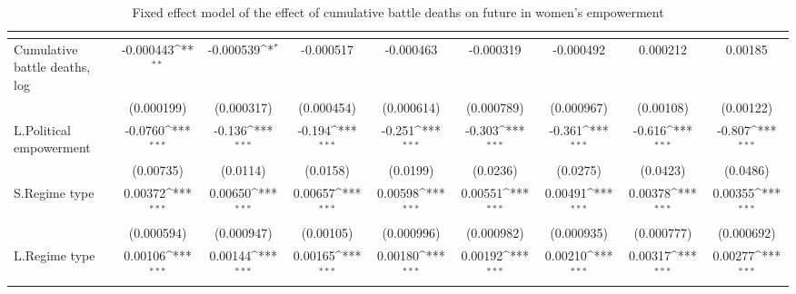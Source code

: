 \begin{table}[htbp]\centering
\def\sym#1{\ifmmode^{#1}\else\(^{#1}\)\fi}
\caption{Fixed effect model of the effect of cumulative battle deaths on future in women's empowerment\label{culmudeaths}}
\begin{tabular}{l*{8}{c}}
\hline\hline
                    &&&&&&&&\\
\hline
Cumulative battle deaths, log&   -0.000443\sym{**} &   -0.000539\sym{*}  &   -0.000517         &   -0.000463         &   -0.000319         &   -0.000492         &    0.000212         &     0.00185         \\
                    &  (0.000199)         &  (0.000317)         &  (0.000454)         &  (0.000614)         &  (0.000789)         &  (0.000967)         &   (0.00108)         &   (0.00122)         \\
[1em]
L.Political empowerment&     -0.0760\sym{***}&      -0.136\sym{***}&      -0.194\sym{***}&      -0.251\sym{***}&      -0.303\sym{***}&      -0.361\sym{***}&      -0.616\sym{***}&      -0.807\sym{***}\\
                    &   (0.00735)         &    (0.0114)         &    (0.0158)         &    (0.0199)         &    (0.0236)         &    (0.0275)         &    (0.0423)         &    (0.0486)         \\
[1em]
S.Regime type       &     0.00372\sym{***}&     0.00650\sym{***}&     0.00657\sym{***}&     0.00598\sym{***}&     0.00551\sym{***}&     0.00491\sym{***}&     0.00378\sym{***}&     0.00355\sym{***}\\
                    &  (0.000594)         &  (0.000947)         &   (0.00105)         &  (0.000996)         &  (0.000982)         &  (0.000935)         &  (0.000777)         &  (0.000692)         \\
[1em]
L.Regime type       &     0.00106\sym{***}&     0.00144\sym{***}&     0.00165\sym{***}&     0.00180\sym{***}&     0.00192\sym{***}&     0.00210\sym{***}&     0.00317\sym{***}&     0.00277\sym{***}\\

\end{tabular}
\end{table}
